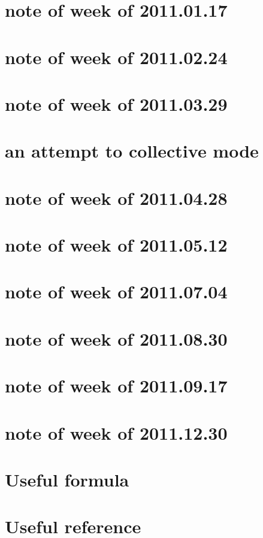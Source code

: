 \documentclass{article}
\begin{document}
\section{note of week of 2011.01.17}

\section{note of week of 2011.02.24}



\section{note of week of 2011.03.29}


\section{an attempt to collective mode}

\section{note of week of 2011.04.28}


\section{note of week of 2011.05.12}

\section{note of week of 2011.07.04}


\section{note of week of 2011.08.30}

\section{note of week of 2011.09.17}




\section{note of week of 2011.12.30}

\appendix
\section{Useful formula}

\section{Useful reference}

\printindex

%

\end{document}
